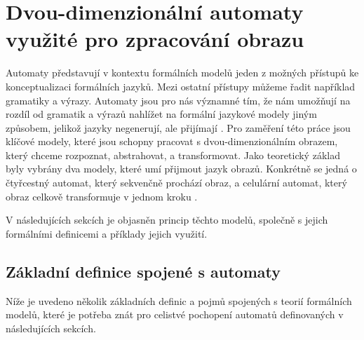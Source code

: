 \chapter{Dvou-dimenzionální automaty využité pro zpracování obrazu}
\label{current}

Automaty představují v kontextu formálních modelů jeden z možných přístupů ke konceptualizaci formálních jazyků. Mezi ostatní přístupy můžeme řadit například gramatiky a výrazy. Automaty jsou pro nás významné tím, že nám umožňují na rozdíl od gramatik a výrazů nahlížet na formální jazykové modely jiným způsobem, jelikož jazyky negenerují, ale přijímají \cite{MedunaAlexander2012Aalt}. Pro zaměření této práce jsou klíčové modely, které jsou schopny pracovat s dvou-dimenzionálním obrazem, který chceme rozpoznat, abstrahovat, a transformovat. Jako teoretický základ byly vybrány dva modely, které umí přijmout jazyk obrazů. Konkrétně se jedná o čtyřcestný automat, který sekvenčně prochází obraz, a celulární automat, který obraz celkově transformuje v jednom kroku \cite{RozenbergGrzegorz1997HoFL}. 

V následujících sekcích je objasněn princip těchto modelů, společně s jejich formálními definicemi a příklady jejich využití. 

\section{Základní definice spojené s automaty}

Níže je uvedeno několik základních definic a pojmů spojených s teorií formálních modelů, které je potřeba znát pro celistvé pochopení automatů definovaných v následujících sekcích.

